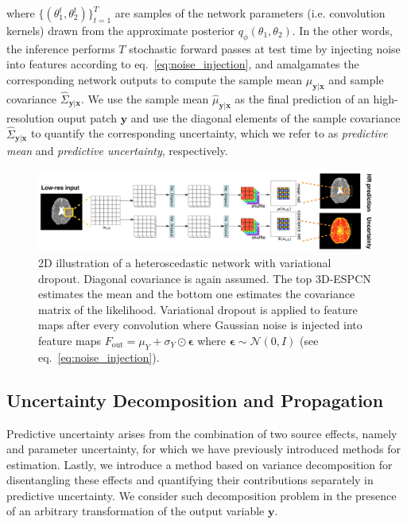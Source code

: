 where $\{(\theta^t_1,\theta^t_2)\}_{t=1}^T$ are samples of the network parameters (i.e. convolution kernels) drawn from the approximate posterior $ q_{\phi}(\theta_1, \theta_{2})$. In the other words, the inference performs $T$ stochastic forward passes at test time by injecting noise into features according to eq.~\ref{eq:noise_injection}, and amalgamates the corresponding network outputs to compute the sample mean $\hat{\mu}_{\mathbf{y}|\mathbf{x}}$ and sample covariance $\hat{\Sigma}_{\mathbf{y}|\mathbf{x}}$. We use the sample mean $\hat{\mu}_{\mathbf{y}|\mathbf{x}}$  as the final prediction of an high-resolution ouput patch $\mathbf{y}$ and use the diagonal elements of the sample covariance $\hat{\Sigma}_{\mathbf{y}|\mathbf{x}}$ to quantify the corresponding uncertainty, which we refer to as \textit{predictive mean} and \textit{predictive uncertainty}, respectively. 



\begin{figure}
	\includegraphics[width=\linewidth]{chapter_3/figures/fig_2_2.png}
	\centering	
	\small 
	\vspace{-8mm}
	\caption{\footnotesize 2D illustration of a heteroscedastic network with variational dropout. Diagonal covariance is again assumed. The top 3D-ESPCN estimates the mean and the bottom one estimates the covariance matrix of the likelihood. Variational dropout is applied to feature maps after every convolution where Gaussian noise is injected into feature maps $F_{\text{out}} = \mu_{Y} +  \sigma_{Y} \odot \mathbf{\epsilon}$ where $\mathbf{\epsilon} \sim \mathcal{N}(0,I)$ (see eq.~\ref{eq:noise_injection}). } 
	\label{fig:heterovar}
\end{figure}

\subsection{Uncertainty Decomposition and Propagation} \label{sec:uncertainty_decom}
Predictive uncertainty arises from the combination of two source effects, namely  and parameter uncertainty, for which we have previously introduced methods for estimation. Lastly, we introduce a method based on variance decomposition for disentangling these effects and quantifying their contributions separately in predictive uncertainty. We consider such decomposition problem in the presence of an arbitrary transformation of the output variable $\mathbf{y}$. 

